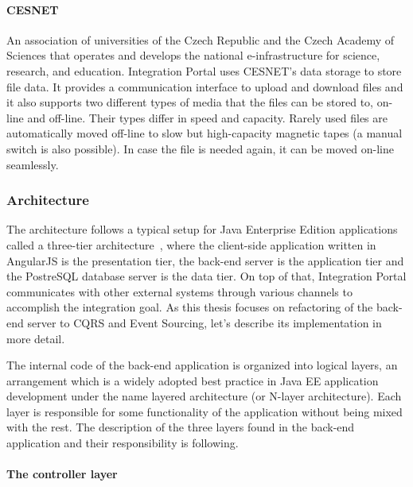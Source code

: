 \documentclass{book}
\begin{document}
\paragraph{CESNET}\label{cesnet}

An association of universities of the Czech Republic and the Czech
Academy of Sciences that operates and develops the national
e-infrastructure for science, research, and education. Integration
Portal uses CESNET's data storage to store file data. It provides a
communication interface to upload and download files and it also
supports two different types of media that the files can be stored to,
on-line and off-line. Their types differ in speed and capacity. Rarely
used files are automatically moved off-line to slow but high-capacity
magnetic tapes (a manual switch is also possible). In case the file is
needed again, it can be moved on-line seamlessly.

\subsubsection{Architecture}\label{architecture}

The architecture follows a typical setup for Java Enterprise Edition
applications called a three-tier architecture~\cite{p-eap}, where the
client-side application written in AngularJS is the presentation tier,
the back-end server is the application tier and the PostreSQL database
server is the data tier. On top of that, Integration Portal communicates
with other external systems through various channels to accomplish the
integration goal. As this thesis focuses on refactoring of the back-end
server to CQRS and Event Sourcing, let's describe its implementation in
more detail.

The internal code of the back-end application is organized into logical
layers, an arrangement which is a widely adopted best practice in Java
EE application development under the name layered architecture (or
N-layer architecture). Each layer is responsible for some functionality
of the application without being mixed with the rest. The description of
the three layers found in the back-end application and their
responsibility is following.

\paragraph{The controller layer}\label{the-controller-layer}
\end{document}
